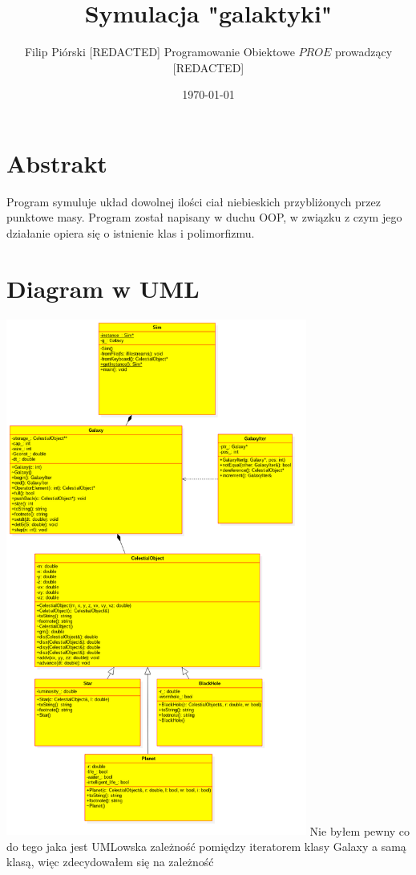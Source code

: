 \documentclass{article}
\title{Symulacja "galaktyki"}
\author{Filip Piórski [REDACTED] Programowanie Obiektowe \(PROE\) prowadzący [REDACTED]}
\date{\today}
\begin{document}
\maketitle
\vspace{1cm}

\section{Abstrakt}
Program symuluje układ dowolnej ilości ciał niebieskich przybliżonych przez punktowe masy. Program został napisany w duchu OOP, w związku z czym jego działanie opiera się o istnienie klas i polimorfizmu.
\newpage
\section{Diagram w UML}
\begin{center}
\vspace{5mm}
\includegraphics[height=17cm]{UML}
Nie byłem pewny co do tego jaka jest UMLowska zależność pomiędzy iteratorem klasy Galaxy a samą klasą, więc zdecydowałem się na zależność
\newpage


\end{center}
\end{document}
